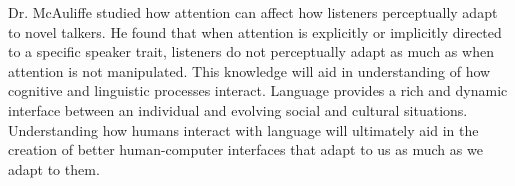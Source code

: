 Dr. McAuliffe studied how attention can affect how listeners perceptually adapt to novel talkers.
He found that when attention is explicitly or implicitly directed to a  specific speaker trait, listeners
do not perceptually adapt as much as when attention is not manipulated.
This knowledge will aid in understanding of how cognitive and linguistic processes interact.
Language provides a rich and dynamic interface between an individual and evolving social and cultural situations.
Understanding how humans interact with language will ultimately aid in the creation of better human-computer interfaces
that adapt to us as much as we adapt to them.
